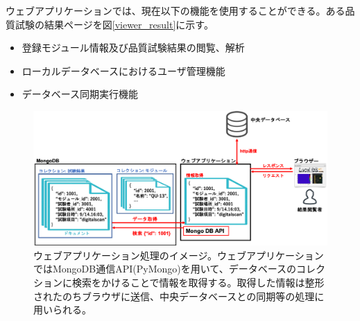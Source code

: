 ウェブアプリケーションでは、現在以下の機能を使用することができる。ある品質試験の結果ページを図\ref{viewer_result}に示す。
\begin{itemize}
  \item 登録モジュール情報及び品質試験結果の閲覧、解析
  \item ローカルデータベースにおけるユーザ管理機能
  \item データベース同期実行機能
\end{itemize}

\begin{figure}[bpt]\centering
\includegraphics[width=16cm]{./webapp_process.png}
\caption[ウェブアプリケーション処理のイメージ]{ウェブアプリケーション処理のイメージ。ウェブアプリケーションではMongoDB通信API(PyMongo)を用いて、データベースのコレクションに検索をかけることで情報を取得する。取得した情報は整形されたのちブラウザに送信、中央データベースとの同期等の処理に用いられる。}
\label{webapp_process}
\end{figure}

